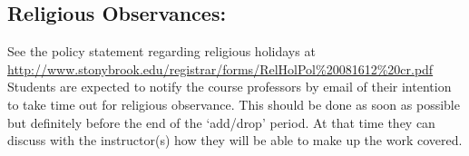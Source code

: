 \documentclass[11pt]{article}
\begin{document}
\subsection*{Religious Observances: }

\noindent See the policy statement regarding religious holidays at
\\[0.25em] {
  \url{http://www.stonybrook.edu/registrar/forms/RelHolPol\%20081612\%20cr.pdf}}
\\[0.25em]
%
Students are expected to notify the course professors by email of
their intention to take time out for religious observance.  This
should be done as soon as possible but definitely before the end of
the `add/drop' period.  At that time they can discuss with the
instructor(s) how they will be able to make up the work covered.
\end{document}
